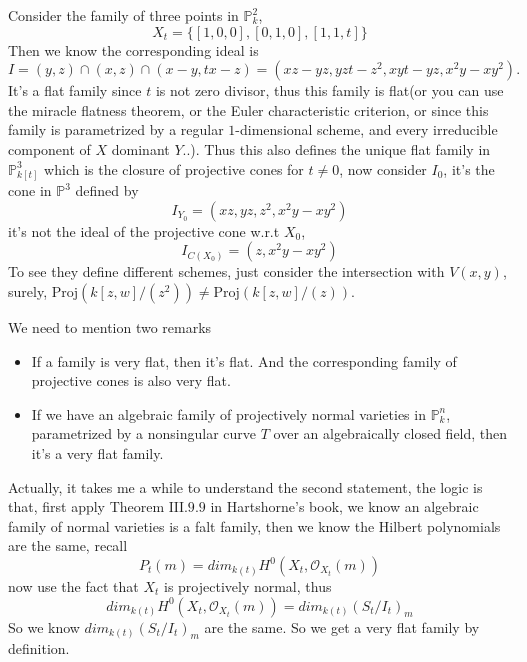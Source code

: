 \documentclass[../main.tex]{subfiles}
\begin{document}
\begin{example}
Consider the family of three points in $\mathbb{P}_{k}^{2}$, $$X_{t}=\{[1,0,0],[0,1,0],[1,1,t]\}$$
Then we know the corresponding ideal is  
$$I=(y,z)\cap(x,z)\cap(x-y,tx-z)=(xz-yz,y zt-z^{2},xyt-yz,x^{2} y-x y^{2}).$$
It's a flat family since $t$ is not zero divisor, thus this family is flat(or you can use the miracle flatness theorem, or the Euler characteristic criterion, or since this family is parametrized by a regular $1$-dimensional scheme, and every irreducible component of $X$ dominant $Y$..). Thus this also defines the unique flat family in $\mathbb{P}_{k[t]}^{3}$ which is the closure of projective cones for $t\neq 0$, now  consider $I_{0}$, it's the cone in $\mathbb{P}^{3}$ defined by 
$$I_{Y_{0}}=(xz, yz,z^{2}, x^{2}y-xy^{2})$$
it's not the ideal of the projective cone w.r.t $X_{0}$, 
$$I_{C(X_{0})}=(z,x^{2}y-xy^{2})$$
To see they define different schemes, just consider the intersection with $V(x,y)$, surely, $\mathrm{Proj}(k[z,w]/(z^{2}))\neq \mathrm{Proj}(k[z,w]/(z)).$
\end{example}
\begin{remark}
We need to mention two remarks
\begin{itemize}
    \item If a family is very flat, then it's flat. And the corresponding family of projective cones is also very flat.
    \item If we have an algebraic family of projectively normal varieties in $\mathbb{P}_{k}^{n}$, parametrized by a nonsingular curve $T$ over an algebraically closed field, then it's a very flat family.
\end{itemize}
Actually, it takes me a while to understand the second statement, the logic is that, first apply Theorem $\mathrm{III}.9.9$ in Hartshorne's book, we know an algebraic family of normal varieties is a falt family, then we know the Hilbert polynomials are the same, recall 
$$P_{t}(m)=dim_{k(t)}H^{0}(X_{t},\mathcal{O}_{X_{t}}(m))$$
now use the fact that $X_{t}$ is projectively normal, thus 
$$dim_{k(t)}H^{0}(X_{t},\mathcal{O}_{X_{t}}(m))=dim_{k(t)}(S_{t}/I_{t})_{m}$$
So we know $dim_{k(t)}(S_{t}/I_{t})_{m}$ are the same. So we get a very flat family by definition.
\end{remark}
\end{document}
